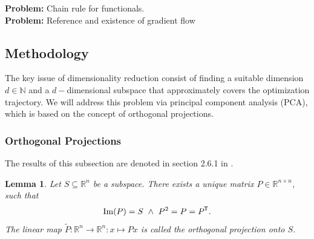 \documentclass[11pt, a4paper]{article}
\newtheorem{lemma}[theorem]{Lemma}
\newcommand{\N}{\mathbb{N}}
\newcommand{\R}{\mathbb{R}}
\newcommand*{\tr}{^{\mkern-1.5mu\mathsf{T}}}
\begin{document}
\textbf{Problem:} Chain rule for functionals. \\
\textbf{Problem:} Reference and existence of gradient flow

\pagebreak
\subsection{Methodology}

The key issue of dimensionality reduction consist of finding a suitable dimension $d \in \N$ and a $d-$dimensional subspace that approximately covers the optimization trajectory. We will address this problem via principal component analysis (PCA), which is based on the concept of orthogonal projections.

\subsubsection{Orthogonal Projections}

The results of this subsection are denoted in section 2.6.1 in \cite{SVD}.

\begin{lemma} \label{lem:orthProjection}
Let $S \subseteq \R^n$ be a subspace. There exists a unique matrix $P \in \R^{n \times n}$, such that
\[ \text{Im}(P) = S \ \wedge \ P^2 = P = P\tr . \]
 The linear map $\tilde{P} : \R^n \to \R^n : x \mapsto Px$ is called the orthogonal projection onto $S$.
\end{lemma}
\end{document}
